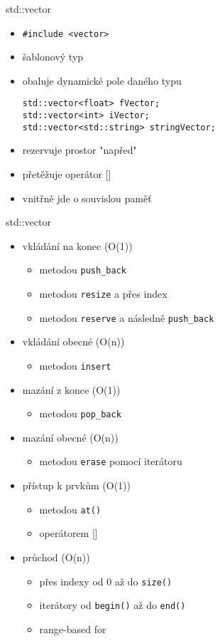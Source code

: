 \documentclass{beamer}
\begin{document}
\begin{xframe}{std::vector}
	\begin{itemize}
		\item \texttt{\#include <vector>}
		\item šablonový typ
		\item obaluje dynamické pole daného typu
\begin{lstlisting}[basicstyle=\fontsize{8}{9}\selectfont\ttfamily]
std::vector<float> fVector;
std::vector<int> iVector;
std::vector<std::string> stringVector;
\end{lstlisting}
		\item rezervuje prostor "napřed"
		\item přetěžuje operátor []
		\item vnitřně jde o souvislou paměť
	\end{itemize}
\end{xframe}

\begin{xframe}{std::vector}
	\begin{itemize}
		\item vkládání na konec (O(1))
			\begin{itemize}
				\item metodou \texttt{push\_back}
				\item metodou \texttt{resize} a přes index
				\item metodou \texttt{reserve} a následně \texttt{push\_back}
			\end{itemize}
		\item vkládání obecné (O(n))
			\begin{itemize}
				\item metodou \texttt{insert}
			\end{itemize}
		\item mazání z konce (O(1))
			\begin{itemize}
				\item metodou \texttt{pop\_back}
			\end{itemize}
		\item mazání obecné (O(n))
			\begin{itemize}
				\item metodou \texttt{erase} pomocí iterátoru
			\end{itemize}
		\item přístup k prvkům (O(1))
			\begin{itemize}
				\item metodou \texttt{at()}
				\item operátorem []
			\end{itemize}
		\item průchod (O(n))
			\begin{itemize}
				\item přes indexy od 0 až do \texttt{size()}
				\item iterátory od \texttt{begin()} až do \texttt{end()}
				\item range-based for
			\end{itemize}
	\end{itemize}
\end{xframe}
\end{document}
